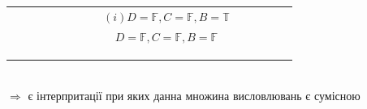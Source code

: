 \documentclass[a4paper,12pt]{article}
\begin{document}
\begin{enumerate}
\begin{landscape}
\begin{table}[htp]
\begin{tabular}{clclcccccccccc}
                                                                               &                       &                                                                                             &                       &                                                                 &                       &                                                                           & \multicolumn{1}{c|}{} & \multicolumn{1}{c|}{\cellcolor[HTML]{FFCCC9}$(i)D=\mathbb{F}, C=\mathbb{F},B=\mathbb{T}$}    &  &  &  &  &  \\
                                                                               &                       &                                                                                             &                       &                                                                 &                       &                                                                           & \multicolumn{1}{c|}{} & \multicolumn{1}{c|}{$D=\mathbb{F}, C=\mathbb{F}, B=\mathbb{F}$}                              &  &  &  &  &  \\ \cline{9-9}
                                                                               &                       &                                                                                             &                       &                                                                 &                       &                                                                           &                       &                                                                                              &  &  &  &  &  \\
                                                                               &                       &                                                                                             &                       &                                                                 &                       &                                                                           &                       &                                                                                              &  &  &  &  &  \\
                                                                               &                       &                                                                                             &                       &                                                                 &                       &                                                                           &                       &                                                                                              &  &  &  &  & 
\end{tabular}
\end{table}\\ $\Rightarrow $ є інтерпритації при яких данна множина висловлювань є сумісною 
\end{landscape}
\end{enumerate}
\end{document}

